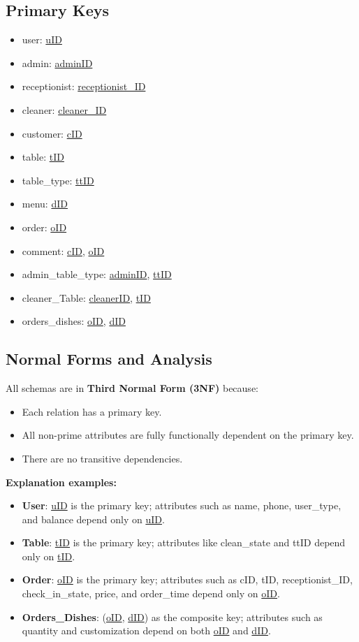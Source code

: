 \documentclass[12pt]{article}
\begin{document}
\subsection{Primary Keys}
\begin{itemize}
    \item user: \underline{uID}
    \item admin: \underline{adminID}
    \item receptionist: \underline{receptionist\_ID}
    \item cleaner: \underline{cleaner\_ID}
    \item customer: \underline{cID}
    \item table: \underline{tID}
    \item table\_type: \underline{ttID}
    \item menu: \underline{dID}
    \item order: \underline{oID}
    \item comment: \underline{cID}, \underline{oID}
    \item admin\_table\_type: \underline{adminID}, \underline{ttID}
    \item cleaner\_Table: \underline{cleanerID}, \underline{tID}
    \item orders\_dishes: \underline{oID}, \underline{dID}
\end{itemize}

\subsection{Normal Forms and Analysis}

All schemas are in \textbf{Third Normal Form (3NF)} because:
\begin{itemize}
    \item Each relation has a primary key.
    \item All non-prime attributes are fully functionally dependent on the primary key.
    \item There are no transitive dependencies.
\end{itemize}

\textbf{Explanation examples:}
\begin{itemize}
    \item \textbf{User}: \underline{uID} is the primary key; attributes such as name, phone, user\_type, and balance depend only on \underline{uID}.
    \item \textbf{Table}: \underline{tID} is the primary key; attributes like clean\_state and ttID depend only on \underline{tID}.
    \item \textbf{Order}: \underline{oID} is the primary key; attributes such as cID, tID, receptionist\_ID, check\_in\_state, price, and order\_time depend only on \underline{oID}.
    \item \textbf{Orders\_Dishes}: (\underline{oID}, \underline{dID}) as the composite key; attributes such as quantity and customization depend on both \underline{oID} and \underline{dID}.
\end{itemize}
\end{document}
